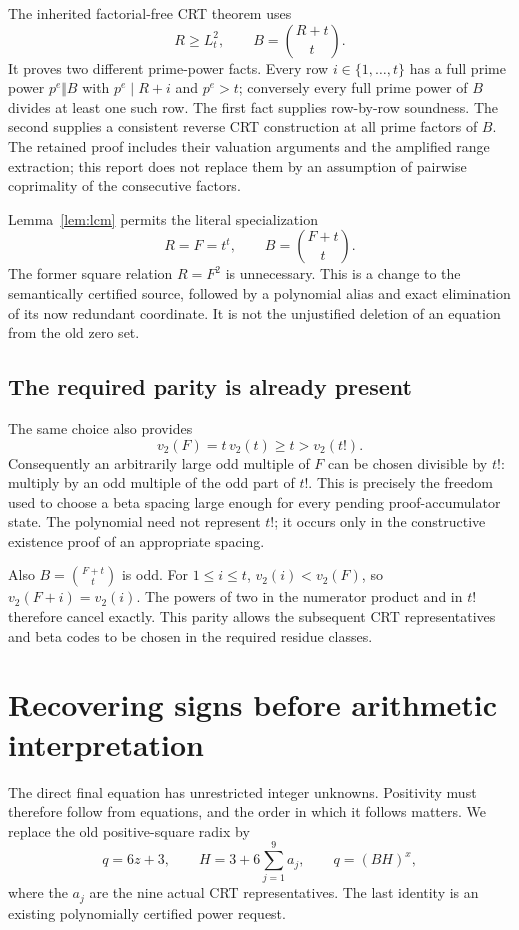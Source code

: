 The inherited factorial-free CRT theorem uses
\[
 R\ge L_t^2,\qquad B=\binom{R+t}{t}.
\]
It proves two different prime-power facts. Every row $i\in\{1,\ldots,t\}$
has a full prime power $p^e\Vert B$ with $p^e\mid R+i$ and $p^e>t$;
conversely every full prime power of $B$ divides at least one such row.
The first fact supplies row-by-row soundness. The second supplies a
consistent reverse CRT construction at all prime factors of $B$.
The retained proof includes their valuation arguments and the amplified
range extraction; this report does not replace them by an assumption of
pairwise coprimality of the consecutive factors.

Lemma~\ref{lem:lcm} permits the literal specialization
\begin{equation}\label{eq:shift}
 R=F=t^t,\qquad B=\binom{F+t}{t}.
\end{equation}
The former square relation $R=F^2$ is unnecessary. This is a change to
the semantically certified source, followed by a polynomial alias and
exact elimination of its now redundant coordinate. It is not the
unjustified deletion of an equation from the old zero set.

\subsection{The required parity is already present}

The same choice also provides
\[
 v_2(F)=t\,v_2(t)\ge t>v_2(t!).
\]
Consequently an arbitrarily large odd multiple of $F$ can be chosen
divisible by $t!$: multiply by an odd multiple of the odd part of $t!$.
This is precisely the freedom used to choose a beta spacing large enough
for every pending proof-accumulator state. The polynomial need not
represent $t!$; it occurs only in the constructive existence proof of an
appropriate spacing.

Also $B=\binom{F+t}{t}$ is odd. For $1\le i\le t$,
$v_2(i)<v_2(F)$, so $v_2(F+i)=v_2(i)$. The powers of two in the
numerator product and in $t!$ therefore cancel exactly. This parity
allows the subsequent CRT representatives and beta codes to be chosen in
the required residue classes.

\section{Recovering signs before arithmetic interpretation}\label{sec:signs}

The direct final equation has unrestricted integer unknowns. Positivity
must therefore follow from equations, and the order in which it follows
matters. We replace the old positive-square radix by
\begin{equation}\label{eq:radix}
 q=6z+3,\qquad H=3+6\sum_{j=1}^{9}a_j,\qquad q=(BH)^x,
\end{equation}
where the $a_j$ are the nine actual CRT representatives. The last identity
is an existing polynomially certified power request.

